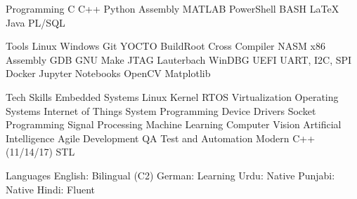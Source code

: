 

\begin{cvskills}

  \cvskill
    {Programming} %
    {C \acvSep C++ \acvSep Python \acvSep Assembly \acvSep MATLAB \acvSep PowerShell \acvSep BASH \acvSep LaTeX \acvSep Java \acvSep PL/SQL} %

  \cvskill
    {Tools} %
    {Linux \acvSep Windows \acvSep Git \acvSep YOCTO \acvSep BuildRoot \acvSep Cross Compiler \acvSep NASM x86 Assembly \acvSep GDB \acvSep GNU Make \acvSep JTAG \acvSep Lauterbach \acvSep WinDBG \acvSep UEFI \acvSep UART, I2C, SPI \acvSep Docker \acvSep Jupyter Notebooks \acvSep OpenCV \acvSep Matplotlib} %

  \cvskill
    {Tech Skills} %
    {Embedded Systems \acvSep Linux Kernel \acvSep RTOS \acvSep Virtualization \acvSep Operating Systems \acvSep Internet of Things \acvSep System Programming \acvSep Device Drivers \acvSep Socket Programming \acvSep Signal Processing \acvSep Machine Learning \acvSep Computer Vision Artificial Intelligence \acvSep Agile Development \acvSep QA Test and Automation \acvSep Modern C++ (11/14/17) \acvSep STL} %

  \cvskill
    {Languages} %
    {English: Bilingual (C2) \acvSep German: Learning \acvSep Urdu: Native \acvSep Punjabi: Native \acvSep Hindi: Fluent} %

\end{cvskills}
